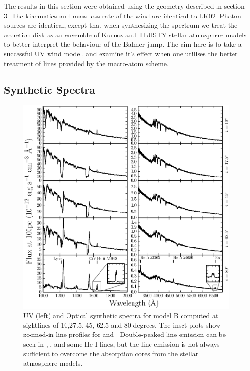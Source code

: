 \documentclass[preprint, a4paper, 11pt]{aastex}
\begin{document}
The results in this section were obtained using the geometry described
in section 3. The kinematics and mass loss rate of the wind are identical
to LK02. Photon sources are identical, except that when synthesizing the
spectrum we treat the accretion disk 
as an ensemble of Kurucz and TLUSTY stellar atmosphere models to better 
interpret the behaviour of the Balmer jump. The aim here is to 
take a successful UV wind model, and examine it's effect 
when one utilises the better treatment of lines provided
by the macro-atom scheme.

\subsection{Synthetic Spectra}

\begin{figure} %
\includegraphics[width=\textwidth]{figures/fig5_uv_opt.eps}
\caption{
UV (left) and Optical synthetic spectra for model B computed at
sightlines of 10,27.5, 45, 62.5 and 80 degrees.	
The inset plots show zoomed-in line profiles for 
\heiiuv and \ha. Double-peaked line emission can be seen in 
\heiiuv, \heiiopt, \ha and some He I lines, but the 
line emission is not always sufficient to overcome the absorption
cores from the stellar atmosphere models.
}
\label{spec}
\end{figure} %
\end{document}
